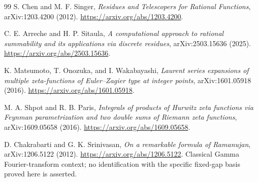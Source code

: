 \begin{thebibliography}{99}
S. Chen and M. F. Singer,
\emph{Residues and Telescopers for Rational Functions},
arXiv:1203.4200 (2012).
\url{https://arxiv.org/abs/1203.4200}.

C. E. Arreche and H. P. Sitaula,
\emph{A computational approach to rational summability and its
applications via discrete residues},
arXiv:2503.15636 (2025).
\url{https://arxiv.org/abs/2503.15636}.

K. Matsumoto, T. Onozuka, and I. Wakabayashi,
\emph{Laurent series expansions of multiple zeta-functions of
Euler--Zagier type at integer points},
arXiv:1601.05918 (2016).
\url{https://arxiv.org/abs/1601.05918}.

M. A. Shpot and R. B. Paris,
\emph{Integrals of products of Hurwitz zeta functions via Feynman
parametrization and two double sums of Riemann zeta functions},
arXiv:1609.05658 (2016).
\url{https://arxiv.org/abs/1609.05658}.

D. Chakrabarti and G. K. Srinivasan,
\emph{On a remarkable formula of Ramanujan},
arXiv:1206.5122 (2012).
\url{https://arxiv.org/abs/1206.5122}.
Classical Gamma Fourier-transform context; no identification with the
specific fixed-gap basis proved here is asserted.

\end{thebibliography}
